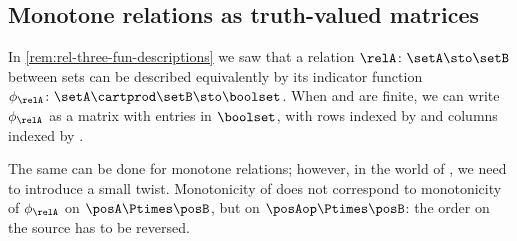 \subsection{Monotone relations as truth-valued matrices}

In \cref{rem:rel-three-fun-descriptions} we saw that a relation $\relA \colon \setA \sto \setB$ between sets can be described equivalently by its indicator function $\phi_\relA \colon \setA \cartprod \setB \sto \boolset$.
When \setA and \setB are finite, we can write $\phi_\relA$ as a matrix with entries in $\boolset$, with rows indexed by \setA and columns indexed by \setB.

The same can be done for monotone relations; however, in the world of , we need to introduce a small twist.
Monotonicity of \relA does not correspond to monotonicity of $\phi_\relA$ on $\posA \Ptimes \posB$, but on $\posAop \Ptimes \posB$: the order on the source has to be reversed.


